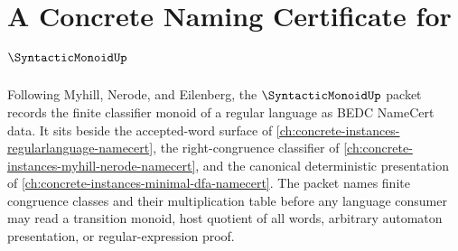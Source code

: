 \chapter{A Concrete Naming Certificate for $\SyntacticMonoidUp$}
\label{ch:concrete-instances-syntactic-monoid-namecert}

Following Myhill, Nerode, and Eilenberg, the $\SyntacticMonoidUp$ packet records the finite classifier monoid of a regular language as BEDC NameCert data. It sits beside the accepted-word surface of \autoref{ch:concrete-instances-regularlanguage-namecert}, the right-congruence classifier of \autoref{ch:concrete-instances-myhill-nerode-namecert}, and the canonical deterministic presentation of \autoref{ch:concrete-instances-minimal-dfa-namecert}. The packet names finite congruence classes and their multiplication table before any language consumer may read a transition monoid, host quotient of all words, arbitrary automaton presentation, or regular-expression proof.

